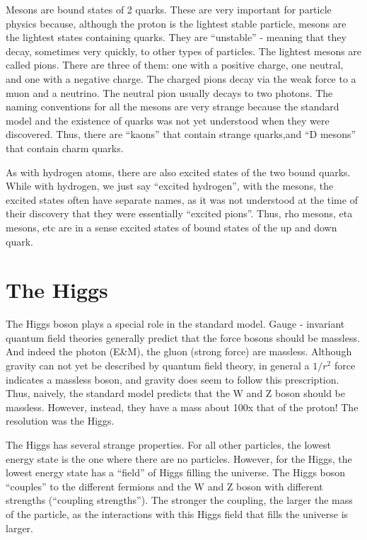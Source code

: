 Mesons are bound states of 2 quarks.  These are very important for particle physics because, although the proton is the lightest stable particle, mesons are the lightest states containing quarks.  They are “unstable” -  meaning that they decay, sometimes very quickly, to other types of particles.
The lightest mesons are called pions.  There are three of them: one with a positive charge, one neutral, and one with a negative charge.  The charged pions decay via the weak force to a muon and a neutrino.  The neutral pion usually decays to two photons.
The naming conventions for all the mesons are very strange because the standard model and the existence of quarks was not yet understood when they were discovered.  Thus, there are “kaons” that contain strange quarks,and  “D mesons” that contain charm quarks.

As with hydrogen atoms, there are also excited states of the two bound quarks.  While with hydrogen, we just say “excited hydrogen”, with the mesons, the excited states often have separate names, as it was not understood at the time of their discovery that they were essentially “excited pions”.  Thus, rho mesons, eta mesons, etc are in a sense excited states of bound states of the up and down quark.

\section{The Higgs}
The  Higgs  boson  plays  a  special  role  in  the  standard  model.    Gauge
- invariant  quantum  field  theories generally 
predict  that  the  force  bosons  should  be  massless. And  indeed  the  photon  (E\&M),  the  gluon 
(strong force) are massless.  Although gravity can not yet be described by quantum field theory, in general a 
$1/r^2$ force indicates a massless boson, and gravity does
seem to follow this prescription.   Thus, naively, the 
standard model predicts that the W and Z boson should be massless.  However, instead, they have a mass 
about 100x that of the proton!  
The resolution was the Higgs.

The Higgs has several strange properties.  For all other particles, the lowest energy state is the one where there are no particles.  However, for the Higgs, the lowest energy state has a ``field'' of Higgs filling the universe.  The Higgs boson ``couples'' to the different fermions and the W and Z boson with different strengths (``coupling strengths'').  The stronger the coupling, the larger the mass of the particle, as the interactions with this Higgs field that fills the universe is larger.

